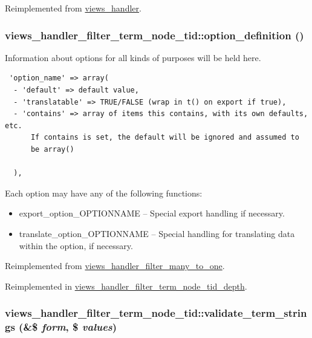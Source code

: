 Reimplemented from \hyperlink{classviews__handler_10d35469346efc352d21e5f44de60b2e}{views\_\-handler}.\hypertarget{classviews__handler__filter__term__node__tid_e81fb582295a2c8871b32bbf8b3ea915}{
\subsubsection[{option\_\-definition}]{\setlength{\rightskip}{0pt plus 5cm}views\_\-handler\_\-filter\_\-term\_\-node\_\-tid::option\_\-definition ()}}
\label{classviews__handler__filter__term__node__tid_e81fb582295a2c8871b32bbf8b3ea915}


Information about options for all kinds of purposes will be held here. 

\begin{Code}\begin{verbatim} 'option_name' => array(
  - 'default' => default value,
  - 'translatable' => TRUE/FALSE (wrap in t() on export if true),
  - 'contains' => array of items this contains, with its own defaults, etc.
      If contains is set, the default will be ignored and assumed to
      be array()

  ),
\end{verbatim}
\end{Code}

 Each option may have any of the following functions:\begin{itemize}
\item export\_\-option\_\-OPTIONNAME -- Special export handling if necessary.\item translate\_\-option\_\-OPTIONNAME -- Special handling for translating data within the option, if necessary. \end{itemize}


Reimplemented from \hyperlink{classviews__handler__filter__many__to__one_e72e4f1ca6a64f22737671275d8d7a92}{views\_\-handler\_\-filter\_\-many\_\-to\_\-one}.

Reimplemented in \hyperlink{classviews__handler__filter__term__node__tid__depth_e0822209bc155abaec93555bbeb93e78}{views\_\-handler\_\-filter\_\-term\_\-node\_\-tid\_\-depth}.\hypertarget{classviews__handler__filter__term__node__tid_762ab62bf1d1431daedea8f5d344bba4}{
\subsubsection[{validate\_\-term\_\-strings}]{\setlength{\rightskip}{0pt plus 5cm}views\_\-handler\_\-filter\_\-term\_\-node\_\-tid::validate\_\-term\_\-strings (\&\$ {\em form}, \/  \$ {\em values})}}
\label{classviews__handler__filter__term__node__tid_762ab62bf1d1431daedea8f5d344bba4}


